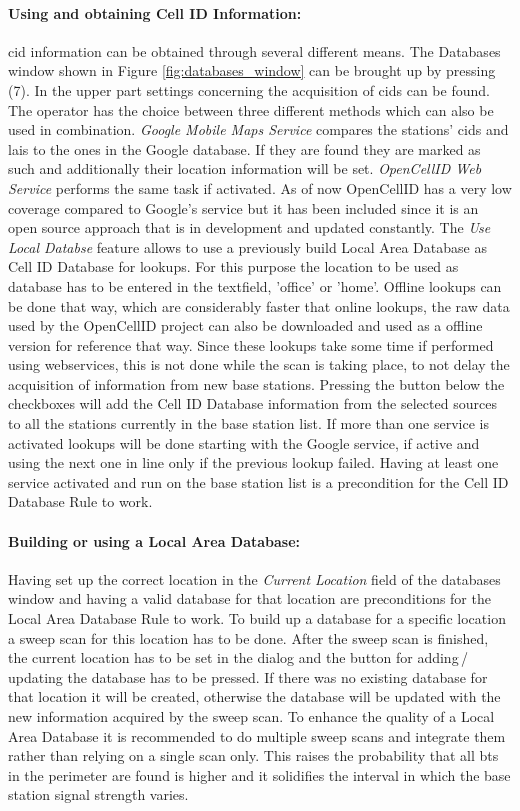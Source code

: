 \paragraph{Using and obtaining Cell ID Information:} \gls{cid} information can be obtained through several different means.
The Databases window shown in Figure \ref{fig:databases_window} can be brought up by pressing (7).
In the upper part settings concerning the acquisition of \glspl{cid} can be found.
The operator has the choice between three different methods which can also be used in combination.
\emph{Google Mobile Maps Service} compares the stations' \glspl{cid} and \glspl{lai} to the ones in the Google database.
If they are found they are marked as such and additionally their location information will be set.
\emph{OpenCellID Web Service} performs the same task if activated.
As of now OpenCellID has a very low coverage compared to Google's service but it has been included since it is an open source approach that is in development and updated constantly.
The \emph{Use Local Databse} feature allows to use a previously build Local Area Database as Cell ID Database for lookups.
For this purpose the location to be used as database has to be entered in the textfield, \eg 'office' or 'home'.
Offline lookups can be done that way, which are considerably faster that online lookups, the raw data used by the OpenCellID project can also be downloaded and used as a offline version for reference that way.
Since these lookups take some time if performed using webservices, this is not done while the scan is taking place, to not delay the acquisition of information from new base stations.
Pressing the button below the checkboxes will add the Cell ID Database information from the selected sources to all the stations currently in the base station list.
If more than one service is activated lookups will be done starting with the Google service, if active and using the next one in line only if the previous lookup failed.
Having at least one service activated and run on the base station list is a precondition for the Cell ID Database Rule to work.

\paragraph{Building or using a Local Area Database:} Having set up the correct location in the \emph{Current Location} field of the databases window and having a valid database for that location are preconditions for the Local Area Database Rule to work.
To build up a database for a specific location a sweep scan for this location has to be done.
After the sweep scan is finished, the current location has to be set in the dialog and the button for adding\,/\,updating the database has to be pressed.
If there was no existing database for that location it will be created, otherwise the database will be updated with the new information acquired by the sweep scan.
To enhance the quality of a Local Area Database it is recommended to do multiple sweep scans and integrate them rather than relying on a single scan only.
This raises the probability that all \gls{bts} in the perimeter are found is higher and it solidifies the interval in which the base station signal strength varies.

